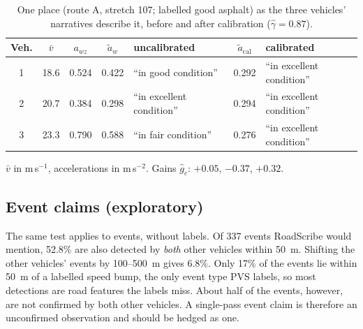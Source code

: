 \begin{table}[t]
\caption{One place (route A, stretch 107; labelled good asphalt) as the three vehicles' narratives describe it, before and after calibration ($\hat\gamma=0.87$).}
\label{tab:example}
\centering
\scriptsize
\setlength{\tabcolsep}{2.2pt}
\begin{tabular}{@{}cccclcl@{}}
\toprule
Veh. & $\bar v$ & $a_{wz}$ & $\tilde a_w$ & uncalibrated & $\tilde a_{\mathrm{cal}}$ & calibrated \\
\midrule
1 & 18.6 & 0.524 & 0.422 & ``in good condition'' & 0.292 & ``in excellent condition'' \\
2 & 20.7 & 0.384 & 0.298 & ``in excellent condition'' & 0.294 & ``in excellent condition'' \\
3 & 23.3 & 0.790 & 0.588 & ``in fair condition'' & 0.276 & ``in excellent condition'' \\
\bottomrule
\end{tabular}

\smallskip
{\scriptsize $\bar v$ in m\,s$^{-1}$, accelerations in m\,s$^{-2}$. Gains $\hat g_c$: $+0.05$, $-0.37$, $+0.32$.}
\end{table}

\subsection{Event claims (exploratory)}
\label{sec:events}
The same test applies to events, without labels.
Of 337 events RoadScribe would mention, 52.8\% are also detected by \emph{both} other vehicles within 50~m. Shifting the other vehicles' events by 100--500~m gives 6.8\%.
Only 17\% of the events lie within 50~m of a labelled speed bump, the only event type PVS labels, so most detections are road features the labels miss.
About half of the events, however, are not confirmed by both other vehicles.
A single-pass event claim is therefore an unconfirmed observation and should be hedged as one.
